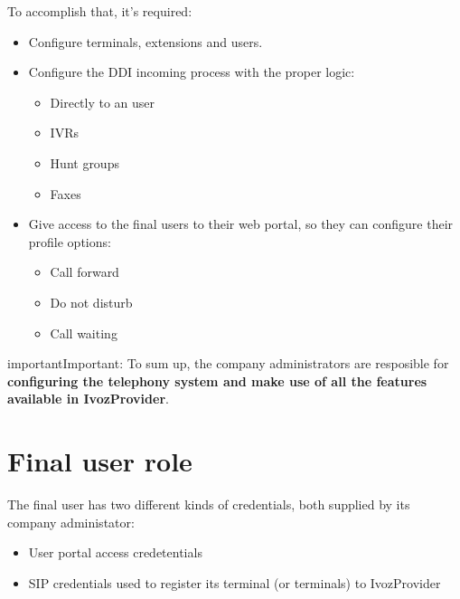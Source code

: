 \documentclass[letterpaper,10pt,english]{sphinxmanual}
\begin{document}
To accomplish that, it's required:
\begin{itemize}
\item {} 
Configure terminals, extensions and users.

\item {} 
Configure the DDI incoming process with the proper logic:
\begin{itemize}
\item {} 
Directly to an user

\item {} 
IVRs

\item {} 
Hunt groups

\item {} 
Faxes

\end{itemize}

\item {} 
Give access to the final users to their web portal, so they can configure
their profile options:
\begin{itemize}
\item {} 
Call forward

\item {} 
Do not disturb

\item {} 
Call waiting

\end{itemize}

\end{itemize}

\begin{notice}{important}{Important:}
To sum up, the company administrators are resposible for
\textbf{configuring the telephony system and make use of all the
features available in IvozProvider}.
\end{notice}


\section{Final user role}
\label{operation_roles/index:final-user-role}
The final user has two different kinds of credentials, both supplied by
its company administator:
\begin{itemize}
\item {} 
User portal access credetentials

\item {} 
SIP credentials used to register its terminal (or terminals) to IvozProvider

\end{itemize}
\end{document}
